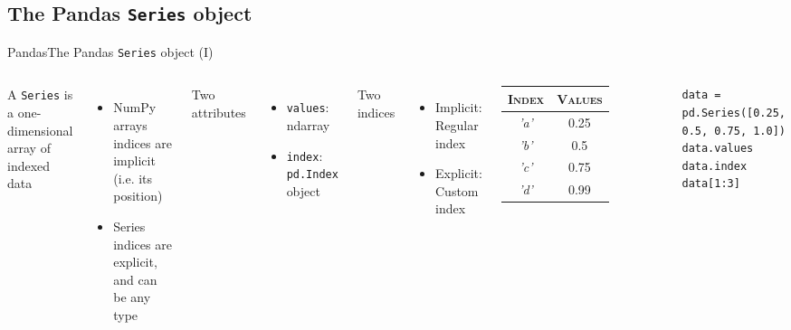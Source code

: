 \documentclass[10pt,compress]{beamer} %
\begin{document}
\subsection{The Pandas \texttt{Series} object}

\begin{frame}[fragile]{Pandas}{The Pandas \texttt{Series} object (I)}
	\begin{columns}

		A \texttt{Series} is a one-dimensional array of indexed data
		\begin{itemize}
			\item NumPy arrays indices are implicit (i.e. its position)
			\item Series indices are explicit, and can be any type
		\end{itemize}
		Two attributes
		\begin{itemize}
			\item \texttt{values}: ndarray
			\item \texttt{index}: \texttt{pd.Index} object
		\end{itemize}
		Two indices
		\begin{itemize}
			\item Implicit: Regular index
			\item Explicit: Custom index
		\end{itemize}

	   \centering
      	\begin{tabularx}{2.7cm}{|c|c|}
			\hline
       		\textsc{Index} &  \textsc{Values}\\ \hline
       		\textit{'a'} & 0.25 \\
       		\textit{'b'} & 0.5  \\
       		\textit{'c'} & 0.75 \\
       		\textit{'d'} & 0.99 \\\hline
    	\end{tabularx}

		\bigskip

		\begin{exampleblock}{}
		\vspace{-0.2cm} 
			\begin{lstlisting}
data = pd.Series([0.25, 0.5, 0.75, 1.0])
data.values
data.index
data[1:3]
\end{lstlisting}
		\vspace{-0.2cm} 
		\end{exampleblock}
	\end{columns}
\end{frame}
\end{document}
